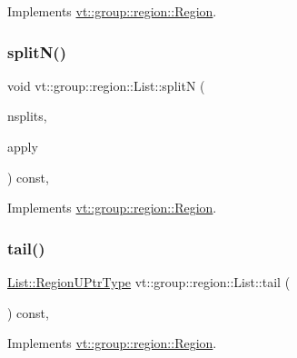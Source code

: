 Implements \hyperlink{structvt_1_1group_1_1region_1_1_region_a2cbbbff6358f0f63235d95501858f512}{vt\+::group\+::region\+::\+Region}.

\mbox{\label{structvt_1_1group_1_1region_1_1_list_ad1950419288564d76527c24bd6d4f3a3}} 
\subsubsection{\texorpdfstring{split\+N()}{splitN()}}
{\footnotesize\ttfamily void vt\+::group\+::region\+::\+List\+::splitN (\begin{DoxyParamCaption}\item[{int}]{nsplits,  }\item[{\hyperlink{structvt_1_1group_1_1region_1_1_region_a7c9e99b1157d2fe2f3e6fc36a1463a96}{Apply\+Fn\+Type}}]{apply }\end{DoxyParamCaption}) const\hspace{0.3cm}{\ttfamily [override]}, {\ttfamily [virtual]}}



Implements \hyperlink{structvt_1_1group_1_1region_1_1_region_ae8660d4218b57e91664dedfa807cd936}{vt\+::group\+::region\+::\+Region}.

\mbox{\label{structvt_1_1group_1_1region_1_1_list_aaa38a1cc3062ed93fd6d6fbe2c65f1cf}} 
\subsubsection{\texorpdfstring{tail()}{tail()}}
{\footnotesize\ttfamily \hyperlink{structvt_1_1group_1_1region_1_1_region_ae5f42cf159116a3cf8bd65423eb01037}{List\+::\+Region\+U\+Ptr\+Type} vt\+::group\+::region\+::\+List\+::tail (\begin{DoxyParamCaption}{ }\end{DoxyParamCaption}) const\hspace{0.3cm}{\ttfamily [override]}, {\ttfamily [virtual]}}



Implements \hyperlink{structvt_1_1group_1_1region_1_1_region_a7d5bc5711c1b7954e27defa4dc94af40}{vt\+::group\+::region\+::\+Region}.



